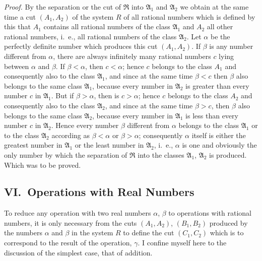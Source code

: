 \documentclass[twoside,openright]{article}
\begin{document}
\textit{Proof.} By the separation or the cut of $\mathfrak{R}$ into
$\mathfrak{A}_1$ and $\mathfrak{A}_2$ we obtain at the same time a cut
$(A_1, A_2)$ of the system $R$ of all rational numbers which is
defined by this that $A_1$ contains all rational numbers of the class
$\mathfrak{A}_1$ and $A_2$ all other rational numbers, i.~e., all
rational numbers of the class $\mathfrak{A}_2$. Let $\alpha$ be the
perfectly definite number which produces this cut $(A_1, A_2)$. If
$\beta$ is any number different from $\alpha$, there are always
infinitely many rational numbers $c$ lying between $\alpha$ and
$\beta$. If $\beta<\alpha$, then $c<\alpha$; hence $c$ belongs to the
class $A_1$ and consequently also to the class $\mathfrak{A}_1$, and
since at the same time $\beta<c$ then $\beta$ also belongs to the same
class $\mathfrak{A}_1$, because every number in $\mathfrak{A}_2$ is
greater than every number $c$ in $\mathfrak{A}_1$. But if
$\beta>\alpha$, then is $c>\alpha$; hence $c$ belongs to the class
$A_2$ and consequently also to the class $\mathfrak{A}_2$, and since
at the same time $\beta>c$, then $\beta$ also belongs to the same
class $\mathfrak{A}_2$, because every number in $\mathfrak{A}_1$ is
less than every number $c$ in $\mathfrak{A}_2$. Hence every number
$\beta$ different from $\alpha$ belongs to the class $\mathfrak{A}_1$
or to the class $\mathfrak{A}_2$ according as $\beta<\alpha$ or
$\beta>\alpha$; consequently $\alpha$ itself is either the greatest
number in $\mathfrak{A}_1$ or the least number in $\mathfrak{A}_2$,
i.~e., $\alpha$ is one and obviously the only number by which the
separation of $\mathfrak{R}$ into the classes $\mathfrak{A}_1$,
$\mathfrak{A}_2$ is produced. Which was to be proved.

\subsection*{VI.\ Operations with Real Numbers}
\label{EISVI}

To reduce any operation with two real numbers $\alpha$, $\beta$ to
operations with rational numbers, it is only necessary from the cuts
$(A_1, A_2)$, $(B_1, B_2)$ produced by the numbers $\alpha$ and
$\beta$ in the system $R$ to define the cut $(C_1, C_2)$ which is to
correspond to the result of the operation, $\gamma$. I confine myself
here to the discussion of the simplest case, that of addition.
\end{document}
